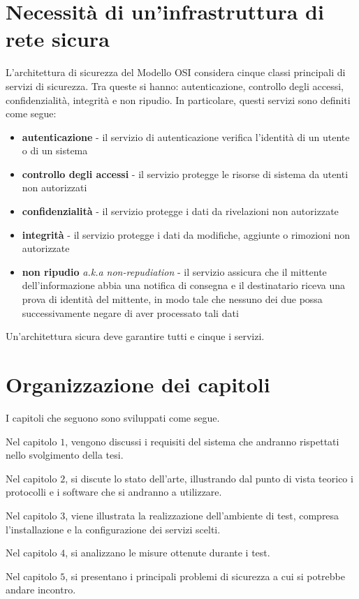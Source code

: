 \section{Necessità di un'infrastruttura di rete sicura}
L'architettura di sicurezza del Modello OSI considera cinque classi principali di servizi di sicurezza. Tra queste si hanno: autenticazione, controllo degli accessi, confidenzialità, integrità e non ripudio.
In particolare, questi servizi sono definiti come segue:
\begin{itemize}
    \item \textbf{autenticazione} - il servizio di autenticazione verifica l'identità di un utente o di un sistema
    \item \textbf{controllo degli accessi} - il servizio protegge le risorse di sistema da utenti non autorizzati
    \item \textbf{confidenzialità} - il servizio protegge i dati da rivelazioni non autorizzate
    \item \textbf{integrità} - il servizio protegge i dati da modifiche, aggiunte o rimozioni non autorizzate
    \item \textbf{non ripudio} \emph{a.k.a non-repudiation} - il servizio assicura che il mittente dell'informazione abbia una notifica di consegna e il destinatario riceva una prova di identità del mittente, in modo tale che nessuno dei due possa successivamente negare di aver processato tali dati
\end{itemize}
Un'architettura sicura deve garantire tutti e cinque i servizi.

\section{Organizzazione dei capitoli}
I capitoli che seguono sono sviluppati come segue.

Nel capitolo $1$, vengono discussi i requisiti del sistema che andranno rispettati nello svolgimento della tesi.

Nel capitolo $2$, si discute lo stato dell'arte, illustrando dal punto di vista teorico i protocolli e i software che si andranno a utilizzare.

Nel capitolo $3$, viene illustrata la realizzazione dell'ambiente di test, compresa l'installazione e la configurazione dei servizi scelti.

Nel capitolo $4$, si analizzano le misure ottenute durante i test.

Nel capitolo $5$, si presentano i principali problemi di sicurezza a cui si potrebbe andare incontro.

